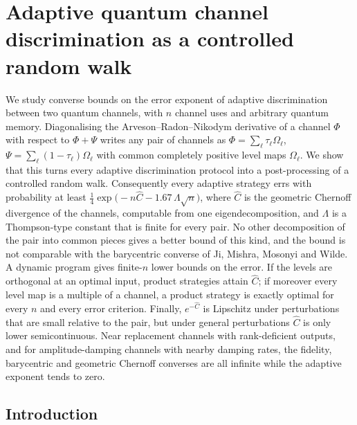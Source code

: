 \chapter{Adaptive quantum channel discrimination as a controlled random walk}\label{chn:chapter}
\begingroup
{}
\setlength{\emergencystretch}{4em}

\begin{chaptersummary}
We study converse bounds on the error exponent of adaptive discrimination between two quantum channels, with $n$ channel uses and arbitrary quantum memory. Diagonalising the Arveson--Radon--Nikodym derivative of a channel $\Phi$ with respect to $\Phi+\Psi$ writes any pair of channels as $\Phi=\sum_\ell\tau_\ell\Omega_\ell$, $\Psi=\sum_\ell(1-\tau_\ell)\Omega_\ell$ with common completely positive level maps $\Omega_\ell$. We show that this turns every adaptive discrimination protocol into a post-processing of a controlled random walk. Consequently every adaptive strategy errs with probability at least $\tfrac14\exp\big(-n\widehat C-1.67\,\Lambda\sqrt n\big)$, where $\widehat C$ is the geometric Chernoff divergence of the channels, computable from one eigendecomposition, and $\Lambda$ is a Thompson-type constant that is finite for every pair.
No other decomposition of the pair into common pieces gives a better bound of this kind, and the bound is not comparable with the barycentric converse of Ji, Mishra, Mosonyi and Wilde.
A dynamic program gives finite-$n$ lower bounds on the error.
If the levels are orthogonal at an optimal input, product strategies attain $\widehat C$; if moreover every level map is a multiple of a channel, a product strategy is exactly optimal for every $n$ and every error criterion.
Finally, $e^{-\widehat C}$ is Lipschitz under perturbations that are small relative to the pair, but under general perturbations $\widehat C$ is only lower semicontinuous. Near replacement channels with rank-deficient outputs, and for amplitude-damping channels with nearby damping rates, the fidelity, barycentric and geometric Chernoff converses are all infinite while the adaptive exponent tends to zero.
\end{chaptersummary}

\section{Introduction}\label{chn:sec:intro}

